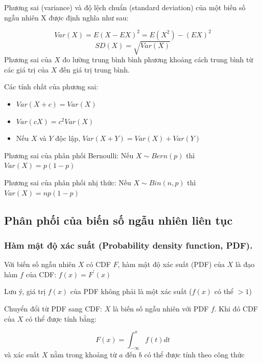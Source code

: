 \documentclass[
]{book}
\providecommand{\tightlist}{%
  \setlength{\itemsep}{0pt}\setlength{\parskip}{0pt}}
\begin{document}
Phương sai (variance) và độ lệch chuẩn (standard deviation) của một biến số ngẫu nhiên X được định nghĩa như sau:

\[
Var(X) = E(X - EX)^2 = E(X^2) - (EX)^2
\]
\[
SD(X) = \sqrt{Var(X)}
\]
Phương sai của \(X\) đo lường trung bình bình phương khoảng cách trung bình từ các giá trị của \(X\) đến giá trị trung bình.

Các tính chất của phương sai:

\begin{itemize}
\tightlist
\item
  \(Var(X + c) = Var(X)\)
\item
  \(Var(cX) = c^2 Var(X)\)
\item
  Nếu \(X\) và \(Y\) độc lập, \(Var(X + Y) = Var(X) + Var(Y)\)
\end{itemize}

Phương sai của phân phối Bernoulli: Nếu \(X \sim Bern(p)\) thì \(Var(X) = p(1-p)\)

Phương sai của phân phối nhị thức: Nếu \(X \sim Bin(n, p)\) thì \(Var(X) = np(1-p)\)

\hypertarget{phuxe2n-phux1ed1i-cux1ee7a-biux1ebfn-sux1ed1-ngux1eabu-nhiuxean-liuxean-tux1ee5c}{%
\subsection{Phân phối của biến số ngẫu nhiên liên tục}\label{phuxe2n-phux1ed1i-cux1ee7a-biux1ebfn-sux1ed1-ngux1eabu-nhiuxean-liuxean-tux1ee5c}}

\hypertarget{huxe0m-mux1eadt-ux111ux1ed9-xuxe1c-suux1ea5t-probability-density-function-pdf.}{%
\subsubsection{Hàm mật độ xác suất (Probability density function, PDF).}\label{huxe0m-mux1eadt-ux111ux1ed9-xuxe1c-suux1ea5t-probability-density-function-pdf.}}

Với biến số ngẫu nhiên \(X\) có CDF \(F\), hàm mật độ xác suất (PDF) của \(X\) là đạo hàm \(f\) của CDF: \(f(x) = F^\prime(x)\)

Lưu ý, giá trị \(f(x)\) của PDF không phải là một xác suất (\(f(x)\) có thể \(>1\))

Chuyển đổi từ PDF sang CDF: \(X\) là biến số ngẫu nhiên với PDF \(f\). Khi đó CDF của \(X\) có thể được tính bằng:

\[
F(x) = \int^x_{-\infty} f(t)dt
\]
và xác suất \(X\) nằm trong khoảng từ \(a\) đến \(b\) có thể được tính theo công thức
\end{document}

